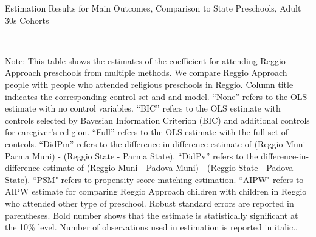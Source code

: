 \begin{table}[H] \caption{Estimation Results for Main Outcomes, Comparison to State Preschools, Adult 30s Cohorts} \label{ols-M-adult30-reg-stat}
\scalebox{0.75}{}
\vspace{1ex} \\
\footnotesize\raggedright{Note: This table shows the estimates of the coefficient for attending Reggio Approach preschools from multiple methods. We compare Reggio Approach people with people who attended religious preschools in Reggio. Column title indicates the corresponding control set and and model. ``None'' refers to the OLS estimate with no control variables. ``BIC'' refers to the OLS estimate with controls selected by Bayesian Information Criterion (BIC) and additional controls for caregiver's religion. ``Full'' refers to the OLS estimate with the full set of controls. ``DidPm'' refers to the difference-in-difference estimate of (Reggio Muni - Parma Muni) - (Reggio State - Parma State). ``DidPv'' refers to the difference-in-difference estimate of (Reggio Muni - Padova Muni) - (Reggio State - Padova State). ``PSM" refers to propensity score matching estimation. ``AIPW" refers to AIPW estimate for comparing Reggio Approach children with children in Reggio who attended other type of preschool. Robust standard errors are reported in parentheses. Bold number shows that the estimate is statistically significant at the 10\% level. Number of observations used in estimation is reported in italic..}
\end{table}




